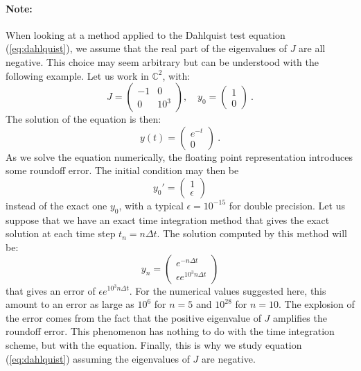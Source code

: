         \paragraph{Note:}
        When looking at a method applied to the Dahlquist test equation (\ref{eq:dahlquist}), we assume that the real part of the eigenvalues of $J$ are all negative.
        This choice may seem arbitrary but can be understood with the following example.
        Let us work in $\mathbb{C}^2$, with:
        \begin{equation}
          J = \begin{pmatrix} -1 & 0 \\ 0 & 10^3 \end{pmatrix}, \quad y_0 = \begin{pmatrix} 1 \\ 0 \end{pmatrix} \ .
        \end{equation}
        The solution of the equation is then:
        \begin{equation}
          y\left(t\right) = \begin{pmatrix} e^{-t} \\ 0 \end{pmatrix} \ .
        \end{equation}
        As we solve the equation numerically, the floating point representation introduces some roundoff error.
        The initial condition may then be
        \begin{equation}
          y_0' = \begin{pmatrix} 1 \\ \epsilon \end{pmatrix}
        \end{equation}
        instead of the exact one $y_0$, with a typical $\epsilon = 10^{-15}$ for double precision.
        Let us suppose that we have an exact time integration method that gives the exact solution at each time step $t_n = n\Delta t$.
        The solution computed by this method will be:
        \begin{equation}
          y_n = \begin{pmatrix} e^{-n\Delta t} \\ \epsilon e^{10^3 n \Delta t} \end{pmatrix}
        \end{equation}
        that gives an error of $\epsilon e^{10^3 n\Delta t}$.
        For the numerical values suggested here, this amount to an error as large as $10^6$ for $n = 5$ and $10^{28}$ for $n = 10$.
        The explosion of the error comes from the fact that the positive eigenvalue of $J$ amplifies the roundoff error.
        This phenomenon has nothing to do with the time integration scheme, but with the equation.
        Finally, this is why we study equation (\ref{eq:dahlquist}) assuming the eigenvalues of $J$ are negative.


